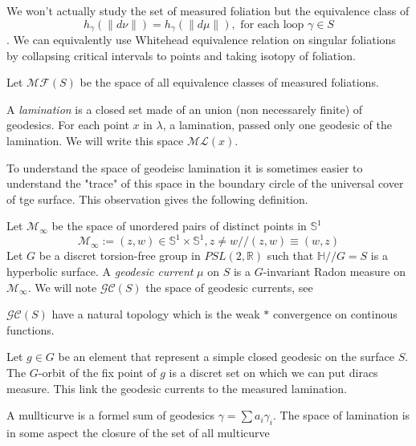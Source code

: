 \begin{rmq}
We won't actually study the set of measured foliation but the equivalence class of \[
h_\gamma(\| d \nu \|)=h_\gamma(\| d \mu \|), \text{ for each loop } \gamma \in S
\].
We can equivalently use Whitehead equivalence relation on singular foliations by collapsing critical intervals to points and taking isotopy of foliation.
\end{rmq}

Let $\mathcal{MF}(S)$ be the space of all equivalence classes of measured foliations.

\begin{dfnt}
A \emph{lamination} is a closed set made of an union (non necessarely finite) of geodesics.
For each point $x$ in $\lambda$, a lamination, passed only one geodesic of the lamination.
We will write this space $\mathcal{ML}(x)$.
\end{dfnt}

To understand the space of geodeisc lamination it is sometimes easier to understand the "trace" of this space in the boundary circle of the universal cover of tge surface. This observation gives the following definition.

\begin{dfnt}
Let $\mathcal{M}_\infty$ be the space of unordered pairs of distinct points in $\mathbb{S}^1$ \[
\mathcal{M}_\infty := {(z,w) \in \mathbb{S}^1 \times \mathbb{S}^1 , z \neq w}//(z,w) \equiv (w,z)
\]
Let $G$ be a discret torsion-free group in $PSL(2,\mathbb{R})$ such that $\mathbb{H}//G=S$ is a hyperbolic surface.
A \emph{geodesic current} $\mu$ on $S$ is a $G$-invariant Radon measure on $\mathcal{M}_\infty$.
We will note $\mathcal{GC}(S)$ the space of geodesic currents, see \cite{kapovich2009hyperbolic}
\end{dfnt}

\begin{rmq}
$\mathcal{GC}(S)$ have a natural topology which is the weak $*$ convergence on continous functions.
\end{rmq}

\begin{exmp}
Let $g \in G$ be an element that represent a simple closed geodesic on the surface $S$. The $G$-orbit of the fix point of $g$ is a discret set on which we can put diracs measure. This link the geodesic currents to the measured lamination.
\end{exmp}

\begin{rmq}
A mullticurve is a formel sum of geodesics $\gamma = \sum a_i \gamma_i$. The space of lamination is in some aspect the closure of the set of all multicurve
\end{rmq}

